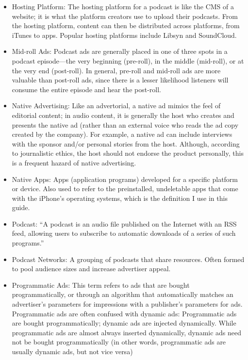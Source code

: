 \documentclass[notoc, symmetric, nobib, nols]{towcenter-guideto-book}
\begin{document}
\begin{itemize}
\item Hosting Platform: The hosting platform for a podcast is like the CMS of a website; it is what the platform creators use to upload their podcasts. From the hosting platform, content can then be distributed across platforms, from iTunes to apps. Popular hosting platforms include Libsyn and SoundCloud.

\item Mid-roll Ads: Podcast ads are generally placed in one of three spots in a podcast episode---the very beginning (pre-roll), in the middle (mid-roll), or at the very end (post-roll). In general, pre-roll and mid-roll ads are more valuable than post-roll ads, since there is a lesser likelihood listeners will consume the entire episode and hear the post-roll.
  
\item Native Advertising: Like an advertorial, a native ad mimics the feel of editorial content; in audio content, it is generally the host who creates and presents the native ad (rather than an external voice who reads the ad copy created by the company). For example, a native ad can include interviews with the sponsor and/or personal stories from the host. Although, according to journalistic ethics, the host should not endorse the product personally, this is a frequent hazard of native advertising.

\item Native Apps: Apps (application programs) developed for a specific platform or device. Also used to refer to the preinstalled, undeletable apps that come with the iPhone's operating systems, which is the definition I use in this guide.

\item Podcast: ``A podcast is an audio file published on the Internet with an RSS feed, allowing users to subscribe to automatic downloads of a series of such programs.''\autocite{techtarget}

\item Podcast Networks: A grouping of podcasts that share resources. Often formed to pool audience sizes and increase advertiser appeal.
 
\item Programmatic Ads: This term refers to ads that are bought programmatically, or through an algorithm that automatically matches an advertiser's parameters for impressions with a publisher's parameters for ads.\autocite{diehnden} Programmatic ads are often confused with dynamic ads: Programmatic ads are bought programmatically; dynamic ads are injected dynamically. While programmatic ads are almost always inserted dynamically, dynamic ads need not be bought programmatically (in other words, programmatic ads are usually dynamic ads, but not vice versa)


\end{itemize}
\end{document}
